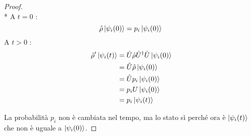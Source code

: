\begin{proof}\mbox{}\\*
    \noindent A $t=0$ :
    \begin{equation*}
          \hat \rho \ket{\psi_i (0)} = p_i \ket{\psi_i (0)} \\
    \end{equation*}
    A $t>0$ :
    \begin{equation*}
        \begin{aligned}
            \hat \rho' \ket{\psi_i (t)} &= \hat U \hat \rho \hat U^\dagger \hat U \ket{\psi_i (0)} \\      
                                        &=\hat U \hat \rho \ket{\psi_i (0)} \\
                                        &=\hat U p_i \ket{\psi_i (0)} \\
                                        &=p_i U \ket{\psi_i (0)} \\
                                        &=p_i\ket{\psi_i (t)}
        \end{aligned}
    \end{equation*}

    \noindent La probabilità $p_i$ non è cambiata nel tempo, ma lo stato sì perché ora è $\ket{\psi_i (t)}$ che non è uguale a $\ket{\psi_i (0)}$.
\end{proof}